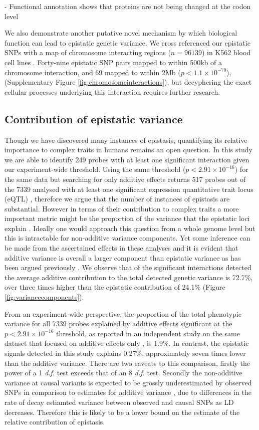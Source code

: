 \documentclass{article}
\begin{document}
- Functional annotation shows that proteins are not being changed at the codon level


We also demonstrate another putative novel mechanism by which biological function can lead to epistatic genetic variance. We cross referenced our epistatic SNPs with a map of chromosome interacting regions ($n = 96139$) in K562 blood cell lines \cite{Lan2012}. Forty-nine epistatic SNP pairs mapped to within 500kb of a chromosome interaction, and 69 mapped to within 2Mb ($p < 1.1 \times 10^{-70}$), (Supplementary Figure \ref{fig:chromosomeinteractions}), but decyphering the exact cellular processes underlying this interaction requires further research.


\subsection{Contribution of epistatic variance}
Though we have discovered many instances of epistasis, quantifying its relative importance to complex traits in humans remains an open question. In this study we are able to identify 249 probes with at least one significant interaction given our experiment-wide threshold. Using the same threshold ($p < 2.91 \times 10^{-16}$) for the same data but searching for only additive effects returns 517 probes out of the 7339 analysed with at least one significant expression quantitative trait locus (eQTL) \cite{Powell2012}, therefore we argue that the number of instances of epistasis are substantial. However in terms of their contribution to complex traits a more important metric might be the proportion of the variance that the epistatic loci explain \cite{Hill2008a}. Ideally one would approach this question from a whole genome level \cite{Visscher2008} but this is intractable for non-additive variance components. Yet some inference can be made from the ascertained effects in these analyses and it is evident that additive variance is overall a larger component than epistatic variance as has been argued previously \cite{Hill2008a, Crow2010}. We observe that of the significant interactions detected the average additive contribution to the total detected genetic variance is 72.7\%, over three times higher than the epistatic contribution of 24.1\% (Figure \ref{fig:variancecomponents}).

From an experiment-wide perspective, the proportion of the total phenotypic variance for all 7339 probes explained by additive effects significant at the $p < 2.91 \times 10^{-16}$ threshold, as reported in an independent study on the same dataset that focused on additive effects only \cite{Powell2012}, is 1.9\%. In contrast, the epistatic signals detected in this study explains 0.27\%, approximately seven times lower than the additive variance. There are two caveats to this comparison, firstly the power of a 1 \emph{d.f.} test exceeds that of an 8 \emph{d.f.} test. Secondly the non-additive variance at causal variants is expected to be grossly underestimated by observed SNPs in comparison to estimates for additive variance \cite{Weir2008, Hemani2013}, due to differences in the rate of decay estiamted variance between observed and causal SNPs as LD decreases. Therefore this is likely to be a lower bound on the estimate of the relative contribution of epistasis.
\end{document}
